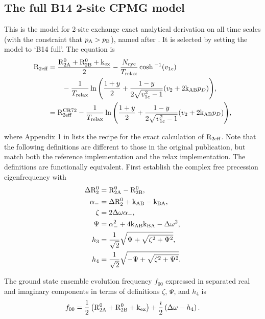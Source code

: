 
\subsection{The full B14 2-site CPMG model}
\label{sect: dispersion: B14 full model}

This is the model for 2-site exchange exact analytical derivation on all time scales (with the constraint that $p_\textrm{A} > p_\textrm{B}$), named after \citet{Baldwin2014}.
It is selected by setting the model to `B14 full'.
The equation is
\begin{subequations}
\begin{align}
  \mathrm{R}_\textrm{2eff} & = \frac{\mathrm{R}_\mathrm{2A}^0 + \mathrm{R}_\mathrm{2B}^0 + \textrm{k}_\textrm{ex} }{2}-\frac{N_\textrm{cyc}}{T_\textrm{relax}} \cosh{}^{-1}(v_{1c}) \nonumber \\
& \qquad - \frac{1}{T_\textrm{relax}}\ln{\left(\frac{1+y}{2} + \frac{1-y}{2\sqrt{v_{1c}^2-1}}(v_2 + 2 \textrm{k}_\textrm{AB}p_D)\right)} , \\
    & = \mathrm{R}_\textrm{2eff}^{\textrm{CR72}} - \frac{1}{T_\textrm{relax}}\ln{\left( \frac{1+y}{2} + \frac{1-y}{2\sqrt{v_{1c}^2-1}}(v_2 + 2\textrm{k}_\textrm{AB}p_D )\right)} ,
\end{align}
\end{subequations}

where Appendix 1 in \citet{Baldwin2014} lists the recipe for the exact calculation of $\mathrm{R}_\textrm{2eff}$.
Note that the following definitions are different to those in the original publication, but match both the reference implementation and the relax implementation.
The definitions are functionally equivalent.
First establish the complex free precession eigenfrequency with
\begin{subequations}
\begin{align}
	\Delta \mathrm{R}_2^0 & = \mathrm{R}_\mathrm{2A}^0 - \mathrm{R}_\mathrm{2B}^0 , \\
	\alpha_- & = \Delta \mathrm{R}_2^0 + \textrm{k}_\textrm{AB} - \textrm{k}_\textrm{BA} , \\
	\zeta & = 2 \Delta\omega \alpha_- , \\
	\Psi & = \alpha_-^2 + 4 \textrm{k}_\textrm{AB} \textrm{k}_\textrm{BA} - \Delta\omega^2 , \\
	h_3 &= \frac{1}{\sqrt{2}}\sqrt{ \Psi + \sqrt{\zeta^2 + \Psi^2} } , \\
    h_4 &= \frac{1}{\sqrt{2}}\sqrt{ -\Psi + \sqrt{\zeta^2 + \Psi^2} } .
\end{align}
\end{subequations}

The ground state ensemble evolution frequency $f_{00}$ expressed in separated real and imaginary components in terms of definitions $\zeta$, $\Psi$, and $h_4$ is
\begin{equation}
	f_{00} = \frac{1}{2}\left(\mathrm{R}_\mathrm{2A}^0 + \mathrm{R}_\mathrm{2B}^0 + \textrm{k}_\textrm{ex}\right) + \frac{\imath}{2}\left(\Delta\omega - h_4\right) .
\end{equation}


